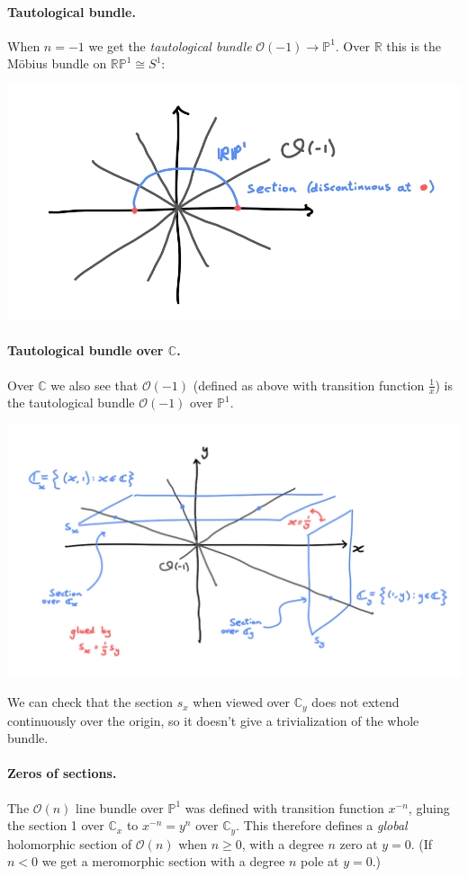 \documentclass{article}
\theoremstyle{definition}
\renewcommand{\O}{\mathcal{O}}
\newcommand{\RP}{\mathbb{RP}}
\renewcommand{\P}{\mathbb{P}}
\newcommand{\R}{\mathbb{R}}
\newcommand{\C}{\mathbb{C}}
\begin{document}
\paragraph{Tautological bundle.}
When $n=-1$ we get the \emph{tautological bundle} $\O(-1)\to\P^1$. Over $\R$
this is the M\"obius bundle on $\RP^1\cong S^1$:
\begin{center}
    \includegraphics[scale=0.5]{chern_taut1}
\end{center}

\paragraph{Tautological bundle over $\C$.}
Over $\C$ we also see that $\O(-1)$ (defined as above with transition
function $\frac{1}{x}$) is the tautological bundle $\O(-1)$ over $\P^1$.
\begin{center}
    \includegraphics[scale=0.5]{chern_taut2}
\end{center}
We can check that the section $s_x$ when viewed over $\C_y$ does not extend
continuously over the origin, so it doesn't give a trivialization of the whole
bundle.

\paragraph{Zeros of sections.}
The $\O(n)$ line bundle over $\P^1$ was defined with transition function
$x^{-n}$, gluing the section 1 over $\C_x$ to $x^{-n}=y^n$ over $\C_y$. This
therefore defines a \emph{global} holomorphic section of $\O(n)$ when
$n\ge0$, with a degree $n$ zero at $y=0$. (If $n<0$ we get a meromorphic section
with a degree $n$ pole at $y=0$.)
\end{document}

